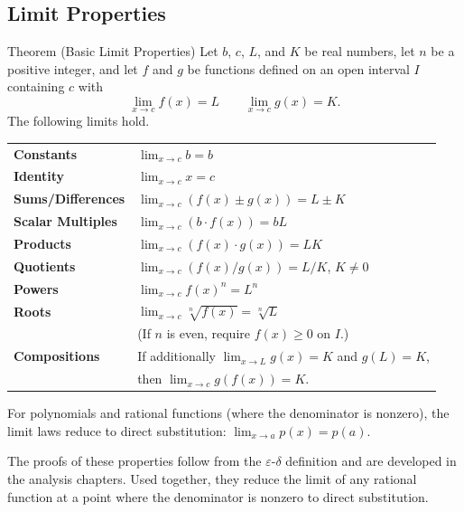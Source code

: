 \subsection{Limit Properties}

\begin{theorembox}{Theorem (Basic Limit Properties)}
Let $b$, $c$, $L$, and $K$ be real numbers, let $n$ be a positive
integer, and let $f$ and $g$ be functions defined on an open interval
$I$ containing $c$ with
\[
  \lim_{x \to c} f(x) = L \qquad \lim_{x \to c} g(x) = K.
\]
The following limits hold.

\medskip
\begin{tabular}{@{}p{}p{}@{}}
\textbf{Constants}        & $\displaystyle\lim_{x \to c} b = b$ \\[10pt]
\textbf{Identity}         & $\displaystyle\lim_{x \to c} x = c$ \\[10pt]
\textbf{Sums/Differences} & $\displaystyle\lim_{x \to c}(f(x) \pm g(x)) = L \pm K$ \\[10pt]
\textbf{Scalar Multiples} & $\displaystyle\lim_{x \to c}(b \cdot f(x)) = bL$ \\[10pt]
\textbf{Products}         & $\displaystyle\lim_{x \to c}(f(x) \cdot g(x)) = LK$ \\[10pt]
\textbf{Quotients}        & $\displaystyle\lim_{x \to c}(f(x)/g(x)) = L/K$, \quad $K \neq 0$ \\[10pt]
\textbf{Powers}           & $\displaystyle\lim_{x \to c} f(x)^n = L^n$ \\[10pt]
\textbf{Roots}            & $\displaystyle\lim_{x \to c} \sqrt[n]{f(x)} = \sqrt[n]{L}$ \\[4pt]
                          & (If $n$ is even, require $f(x) \geq 0$ on $I$.) \\[10pt]
\textbf{Compositions}     & If additionally $\displaystyle\lim_{x \to L} g(x) = K$ and $g(L) = K$, \\[6pt]
                          & then $\displaystyle\lim_{x \to c} g(f(x)) = K$. \\
\end{tabular}
\end{theorembox}

\begin{remark*}
For polynomials and rational functions (where the denominator is nonzero),
the limit laws reduce to direct substitution: $\lim_{x \to a} p(x) = p(a)$.
\end{remark*}

\begin{remark*}
The proofs of these properties follow from the $\varepsilon$-$\delta$
definition and are developed in the analysis chapters.
Used together, they reduce the limit of any rational function at a
point where the denominator is nonzero to direct substitution.
\end{remark*}